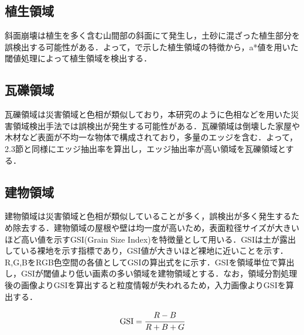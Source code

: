 \documentclass[../Thesis]{subfiles}
\begin{document}
\subsection{植生領域}
  斜面崩壊は植生を多く含む山間部の斜面にて発生し，土砂に混ざった植生部分を誤検出する可能性がある．よって，で示した植生領域の特徴から，a*値を用いた閾値処理によって植生領域を検出する．
	
\subsection{瓦礫領域}
  瓦礫領域は災害領域と色相が類似しており，本研究のように色相などを用いた災害領域検出手法では誤検出が発生する可能性がある．瓦礫領域は倒壊した家屋や木材など表面が不均一な物体で構成されており，多量のエッジを含む．よって，2.3節と同様にエッジ抽出率を算出し，エッジ抽出率が高い領域を瓦礫領域とする．  

\subsection{建物領域}
  建物領域は災害領域と色相が類似していることが多く，誤検出が多く発生するため除去する．建物領域の屋根や壁は均一度が高いため，表面粒径サイズが大きいほど高い値を示すGSI(Grain Size Index)\cite{art08}を特徴量として用いる．GSIは土が露出している裸地を示す指標であり，GSI値が大きいほど裸地に近いことを示す．R,G,BをRGB色空間の各値としてGSIの算出式をに示す．GSIを領域単位で算出し，GSIが閾値より低い画素の多い領域を建物領域とする．なお，領域分割処理後の画像よりGSIを算出すると粒度情報が失われるため，入力画像よりGSIを算出する．
  
  \begin{equation}
      \begin{array}{l}
        {\rm GSI} = \cfrac{R-B}{R+B+G} \\
      \end{array}
    \label{form11}
  \end{equation}
  
  
  
\end{document}
